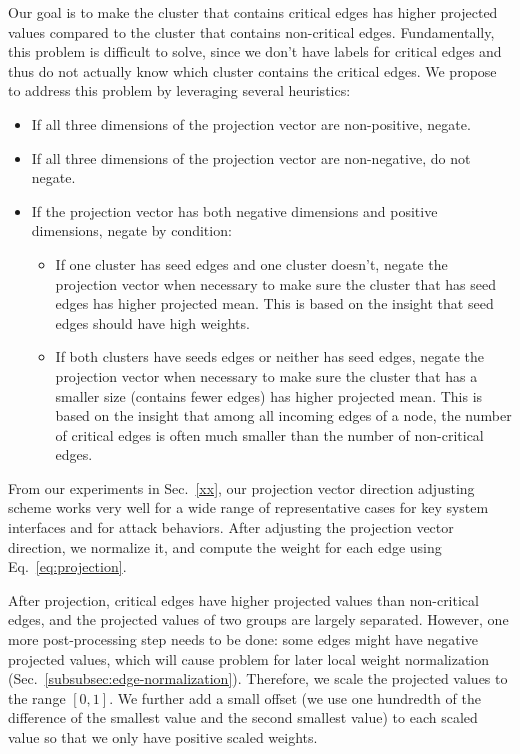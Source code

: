 Our goal is to make the cluster that contains critical edges has higher projected values compared to the cluster that contains non-critical edges. Fundamentally, this problem is difficult to solve, since we don't have labels for critical edges and thus do not actually know which cluster contains the critical edges.
%
We propose to address this problem by leveraging several heuristics:
\begin{itemize}[noitemsep, topsep=1pt, partopsep=1pt, listparindent=\parindent, leftmargin=*]

\item If all three dimensions of the projection vector are non-positive, negate.
\item If all three dimensions of the projection vector are non-negative, do not negate.
\item If the projection vector has both negative dimensions and positive dimensions, negate by condition:

\begin{itemize}[noitemsep, topsep=1pt, partopsep=1pt, listparindent=\parindent, leftmargin=*]
    \item If one cluster has seed edges and one cluster doesn't, negate the projection vector when necessary to make sure the cluster that has seed edges has higher projected mean. This is based on the insight that seed edges should have high weights.
    \item If both clusters have seeds edges or neither has seed edges, negate the projection vector when necessary to make sure the cluster that has a smaller size (\ie contains fewer edges) has higher projected mean. This is based on the insight that among all incoming edges of a node, the number of critical edges is often much smaller than the number of non-critical edges.
\end{itemize}
\end{itemize}

From our experiments in Sec.~\ref{xx}, our projection vector direction adjusting scheme works very well for a wide range of representative cases for key system interfaces and for attack behaviors.
After adjusting the projection vector direction, we normalize it, and compute the weight for each edge using Eq.~\ref{eq:projection}. 

After projection, critical edges have higher projected values than non-critical edges, and the projected values of two groups are largely separated.
However, one more post-processing step needs to be done: some edges might have negative projected values, which will cause problem for later local weight normalization (Sec.~\ref{subsubsec:edge-normalization}). 
Therefore, we scale the projected values to the range $[0, 1]$. We further add a small offset (we use one hundredth of the difference of the smallest value and the second smallest value) to each scaled value so that we only have positive scaled weights.


